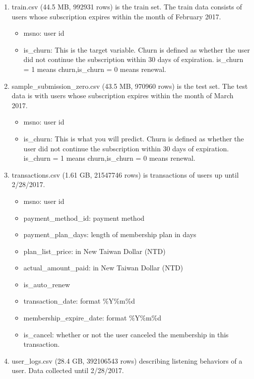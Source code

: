 \documentclass[11pt]{article}
\begin{document}
\begin{enumerate}
\def\labelenumi{\arabic{enumi}.}
\itemsep1pt\parskip0pt
\item
  train.csv (44.5 MB, 992931 rows) is the train set. The train data
  consists of users whose subscription expires within the month of
  February 2017.

  \begin{itemize}
  \itemsep1pt\parskip0pt
  \item
    msno: user id
  \item
    is\_churn: This is the target variable. Churn is defined as whether
    the user did not continue the subscription within 30 days of
    expiration. is\_churn = 1 means churn,is\_churn = 0 means renewal.
  \end{itemize}
\item
  sample\_submission\_zero.csv (43.5 MB, 970960 rows) is the test set.
  The test data is with users whose subscription expires within the
  month of March 2017.

  \begin{itemize}
  \itemsep1pt\parskip0pt
  \item
    msno: user id
  \item
    is\_churn: This is what you will predict. Churn is defined as
    whether the user did not continue the subscription within 30 days of
    expiration. is\_churn = 1 means churn,is\_churn = 0 means renewal.
  \end{itemize}
\item
  transactions.csv (1.61 GB, 21547746 rows) is transactions of users up
  until 2/28/2017.

  \begin{itemize}
  \itemsep1pt\parskip0pt
  \item
    msno: user id
  \item
    payment\_method\_id: payment method
  \item
    payment\_plan\_days: length of membership plan in days
  \item
    plan\_list\_price: in New Taiwan Dollar (NTD)
  \item
    actual\_amount\_paid: in New Taiwan Dollar (NTD)
  \item
    is\_auto\_renew
  \item
    transaction\_date: format \%Y\%m\%d
  \item
    membership\_expire\_date: format \%Y\%m\%d
  \item
    is\_cancel: whether or not the user canceled the membership in this
    transaction.
  \end{itemize}
\item
  user\_logs.csv (28.4 GB, 392106543 rows) describing listening
  behaviors of a user. Data collected until 2/28/2017.


\end{enumerate}
\end{document}
